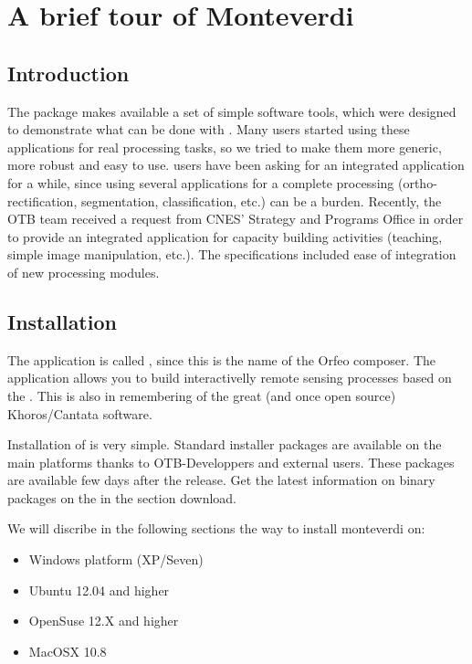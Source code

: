 \chapter{A brief tour of Monteverdi}\label{chap:Monteverdi} 

\section{Introduction}\label{sec:montintro}
The \app package makes available a set of simple software
tools, which were designed to demonstrate what can be done with
\otb. Many users started using these applications for real processing
tasks, so we tried to make them more generic, more robust and easy to
use. \otb users have been asking for an integrated application for a
while, since using several applications for a complete processing
(ortho-rectification, segmentation, classification, etc.) can be a
burden. Recently, the OTB team received a request from CNES' Strategy
and Programs Office in order to provide an integrated application for
capacity building activities (teaching, simple image manipulation,
etc.). The specifications included ease of integration of new
processing modules.  

\section{Installation}\label{sec:montinstall} 
The application is called \mont, since this is the name of the Orfeo
composer. The application allows you to build interactivelly remote
sensing processes based on the \otb. This is also in
remembering of the great (and once open source) Khoros/Cantata
software.
  
Installation of \mont is very simple. Standard installer packages are available on the main platforms thanks to OTB-Developpers and external users. These packages are available few days after the release. Get the latest information on binary packages on the \website in the section download.

We will discribe in the following sections the way to install monteverdi on:
\begin{itemize}
\item Windows platform (XP/Seven)
\item Ubuntu 12.04 and higher
\item OpenSuse 12.X and higher
\item MacOSX 10.8
\end{itemize}

